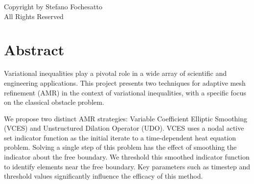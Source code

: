 \documentclass[12 pt]{report}
\begin{document}
\newpage\null\thispagestyle{empty}\newpage

\setcounter{page}{3}

  \vspace*{10\baselineskip}
  \begin{center}
    Copyright by Stefano Fochesatto\\

    All Rights Reserved
  \end{center}
  \clearpage




\chapter*{Abstract}
\noindent
Variational inequalities play a pivotal role in a wide array of scientific and engineering
applications. This project presents two techniques for adaptive mesh refinement (AMR) in the context of variational inequalities, with a specific focus on the classical obstacle problem. 

We propose two distinct AMR strategies: Variable Coefficient Elliptic Smoothing (VCES) and Unstructured Dilation Operator (UDO). VCES uses a nodal active set indicator function as the initial iterate to a time-dependent heat equation problem. Solving a single step of this problem has the effect of smoothing the indicator about the free boundary. We threshold this smoothed indicator function to identify elements near the free boundary. Key parameters such as timestep and threshold values significantly influence the efficacy of this method.
\end{document}
